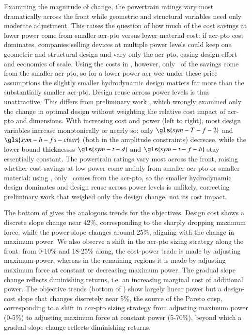     Examining the magnitude of change, the powertrain ratings vary most dramatically across the front while geometric and structural variables need only moderate adjustment.
    This raises the question of how much of the cost savings at lower power come from smaller \gls{acr-pto} versus lower material cost:
    if \gls{acr-pto} cost dominates, companies selling devices at multiple power levels could keep one geometric and structural design and vary only the \gls{acr-pto},
    easing design effort and economies of scale.
    Using the costs in , however,
    only \resultsRE[pctCostSavingsFromPTO]~of the savings come from the smaller \gls{acr-pto},
    so for a lower-power \gls{acr-wec} under these price assumptions the slightly smaller hydrodynamic design matters far more than the substantially smaller \gls{acr-pto}.
    Design reuse across power levels is thus unattractive.
    This differs from preliminary work \citep{mccabe_multidisciplinary_2022},
    which wrongly examined only the change in optimal design without weighting the relative cost impact of \gls{acr-pto} and dimensions.
\else
    With increasing cost and power (left to right), most design variables increase monotonically or nearly so; only $\gls{sym-T-f-2}$ and $\gls{sym-h-fs-clear}$ (both in the amplitude constraints) decrease, while the lower-bound thicknesses $\gls{sym-t-d}$ and $\gls{sym-t-f-b}$ stay essentially constant.
    The powertrain ratings vary most across the front, raising whether cost savings at low power come mainly from smaller \gls{acr-pto} or smaller material: using , only \resultsRE[pctCostSavingsFromPTO]~comes from the \gls{acr-pto}, so the smaller hydrodynamic design dominates and design reuse across power levels is unlikely, correcting preliminary work \citep{mccabe_multidisciplinary_2022} that weighed only the design change, not its cost impact.
\fi

\ifdefined\DISSERTATION
    The bottom of  gives the analogous trends for the objectives.
    Design cost shows a discrete slope change near 42\%, corresponding to the sharply dropping maximum force, while the power slope changes around 25\%, aligning with the change in maximum power.
    We also observe a shift in the \gls{acr-pto} sizing strategy along the front: from 0-10\% and 18-25\% along, the cost-power trade is made by adjusting maximum power, whereas in the remaining regions it is made by adjusting maximum force at constant or decreasing maximum power.
    The gradual slope change reflects diminishing returns, i.e. an increasing marginal cost of additional power.
\else
    The objective trends (bottom of ) show largely linear power but a design-cost slope that changes discretely near 5\%, the source of the Pareto cusp, corresponding to a shift in \gls{acr-pto} sizing strategy from adjusting maximum power (0-5\%) to adjusting maximum force at constant power (5-70\%), beyond which a gradual slope change reflects diminishing returns.
\fi

